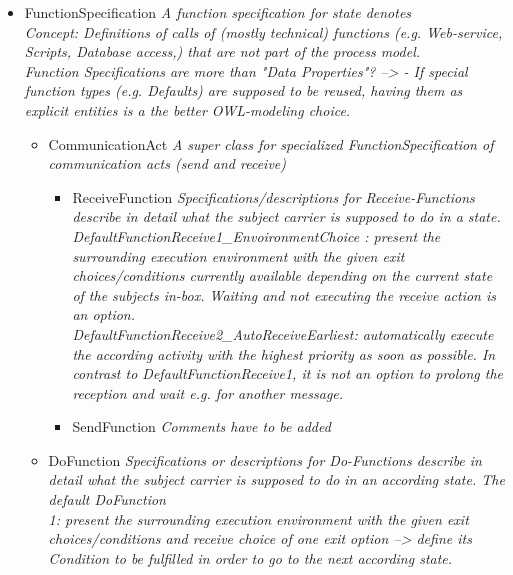 \begin{itemize}
\begin{itemize}
\begin{itemize}
\begin{itemize}
		\end{itemize}
		\item FunctionSpecification \linebreak \textit{A function specification for state denotes \\ 
			Concept: Definitions of calls of (mostly technical) functions (e.g. Web-service, Scripts, Database access,) that are not part of the process model.\\
			Function Specifications are more than "Data Properties"? --> - If special function types (e.g. Defaults) are supposed to be reused, having them as explicit entities is a the better OWL-modeling choice.}
		\begin{itemize}
			\item CommunicationAct \linebreak \textit{A super class for specialized FunctionSpecification of communication acts (send and receive)}
			\begin{itemize}
				\item ReceiveFunction \linebreak \textit{Specifications/descriptions for Receive-Functions describe in detail what the subject carrier is supposed to do in a state.\\
				DefaultFunctionReceive1\_EnvoironmentChoice : present the surrounding execution environment with the given exit choices/conditions currently available depending on the current state of the subjects in-box. Waiting and not executing the receive action is an option.\\
				DefaultFunctionReceive2\_AutoReceiveEarliest: automatically execute the according activity with the highest priority as soon as possible. In contrast to DefaultFunctionReceive1, it is not an option to prolong the reception and wait e.g. for another message.}
				\item SendFunction \linebreak \textit{Comments have to be added}
			\end{itemize}
			\item DoFunction \linebreak \textit{Specifications or descriptions for Do-Functions describe in detail what the subject carrier is supposed to do in an according state.
			The default DoFunction\\ 1: present the surrounding execution environment with the given exit choices/conditions and receive choice of one exit option --> define its Condition to be fulfilled in order to go to the next according state.
}
\end{itemize}
\end{itemize}
\end{itemize}
\end{itemize}
